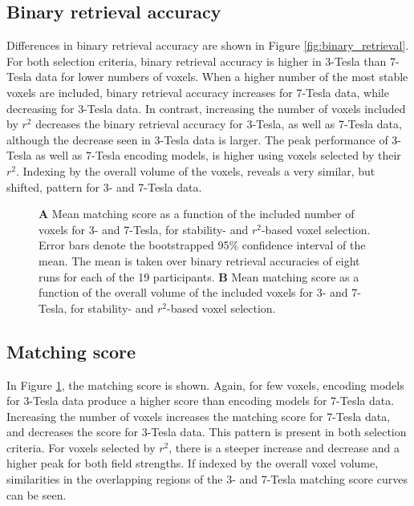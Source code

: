 \subsection*{Binary retrieval accuracy}

Differences in binary retrieval accuracy are shown in Figure
\ref{fig:binary_retrieval}. For both selection criteria, binary retrieval
accuracy is higher in 3-Tesla than 7-Tesla data for lower numbers of voxels.
When a higher number of the most stable voxels are included, binary retrieval
accuracy increases for 7-Tesla data, while decreasing for 3-Tesla data.    In
contrast, increasing the number of voxels included by $r^2$ decreases the
binary retrieval accuracy for 3-Tesla, as well as 7-Tesla data, although the
decrease seen in 3-Tesla data is larger. The peak performance of 3-Tesla as
well as 7-Tesla encoding models, is higher using voxels selected by their
$r^2$.  Indexing by the overall volume of the voxels, reveals a very similar,
but shifted, pattern for 3- and 7-Tesla data.

\begin{figure}
  \centering
  \def\svgwidth{\linewidth}
  
	
  \caption{\textbf{A} Mean matching score as a function of the included number
  of voxels for 3- and 7-Tesla, for stability- and $r^2$-based voxel selection.
  Error bars denote the bootstrapped 95\% confidence interval of the mean. The
  mean is taken over binary retrieval accuracies of eight runs for each of the
  19 participants. \textbf{B} Mean matching score as a function of the overall
volume of the included voxels for 3- and 7-Tesla, for stability- and
$r^2$-based voxel selection.}

 \label{fig:matching_score}
\end{figure}

\subsection*{Matching score}

In Figure \ref{fig:matching_score}, the matching score is shown. Again, for few
voxels, encoding models for 3-Tesla data produce a higher score than encoding
models for 7-Tesla data. Increasing the number of voxels increases the matching
score for 7-Tesla data, and decreases the score for 3-Tesla data. This pattern
is present in both selection criteria. For voxels selected by $r^2$, there is a
steeper increase and decrease and a higher peak for both field strengths.  If
indexed by the overall voxel volume, similarities in the overlapping regions of
the 3- and 7-Tesla matching score curves can be seen.

